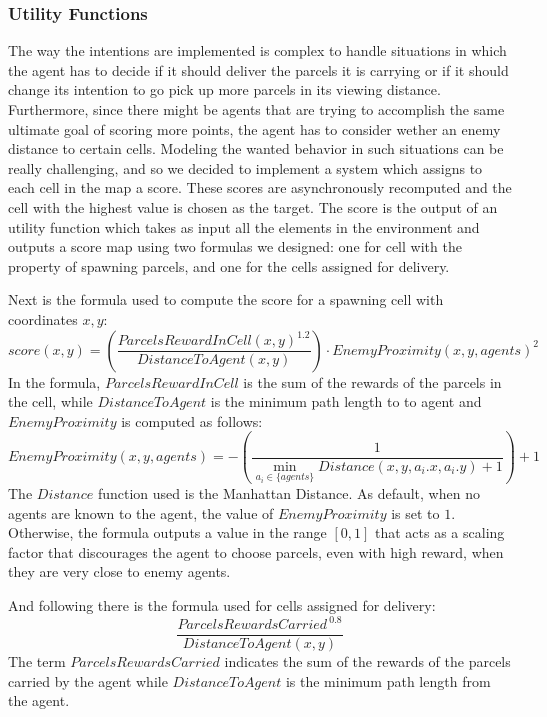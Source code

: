 \documentclass[a4paper, 11pt]{article}
\begin{document}
\subsubsection{Utility Functions}
The way the intentions are implemented is complex to handle situations in which the agent has to decide if it should deliver the parcels it is carrying or if it should change its intention to go pick up more parcels in its viewing distance. Furthermore, since there might be agents that are trying to accomplish the same ultimate goal of scoring more points, the agent has to consider wether an enemy distance to certain cells. Modeling the wanted behavior in such situations can be really challenging, and so we decided to implement a system which assigns to each cell in the map a score. These scores are asynchronously recomputed and the cell with the highest value is chosen as the target. The score is the output of an utility function which takes as input all the elements in the environment and outputs a score map using two formulas we designed: one for cell with the property of spawning parcels, and one for the cells assigned for delivery.

Next is the formula used to compute the score for a spawning cell with coordinates $x,y$:
\begin{equation}
score(x,y) = \left(\frac{{ParcelsRewardInCell(x,y)^{1.2}}}{{DistanceToAgent(x,y)}}\right) \cdot EnemyProximity(x,y,agents)^2
\end{equation}
In the formula, $ParcelsRewardInCell$ is the sum of the rewards of the parcels in the cell, while $DistanceToAgent$ is the minimum path length to to agent and $EnemyProximity$ is computed as follows:
\begin{equation}
EnemyProximity(x,y,agents) = -(\frac{1}{\min_{a_{i} \in \{agents\}} Distance(x, y, a_{i}.x, a_{i}.y) +1}) + 1
\end{equation}
The $Distance$ function used is the Manhattan Distance. As default, when no agents are known to the agent, the value of $EnemyProximity$ is set to $1$. Otherwise, the formula outputs a value in the range $[0,1]$ that acts as a scaling factor that discourages the agent to choose parcels, even with high reward, when they are very close to enemy agents.

And following there is the formula used for cells assigned for delivery:
\begin{equation}
\frac{ParcelsRewardsCarried^{~0.8}}{DistanceToAgent(x,y)}
\end{equation}
The term $ParcelsRewardsCarried$ indicates the sum of the rewards of the parcels carried by the agent while $DistanceToAgent$ is the minimum path length from the agent.
\end{document}
